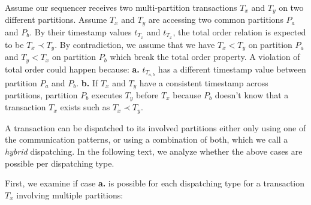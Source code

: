 \documentclass[a4paper, 10pt]{article}
\newcommand{\Li}[1]{\mynote{Li}{#1}{blue}}
\begin{document}
Assume our sequencer receives two multi-partition transactions $T_x$ and $T_y$ on two different partitions.
Assume $T_x$ and $T_y$ are accessing two common partitions $P_a$ and $P_b$. By their timestamp
values $t_{T_{x}}$ and $t_{T_x}$, the total order relation is expected to be $T_x \prec T_y$.
By contradiction, we assume that we have $T_x < T_y$ on partition $P_a$ and $T_y < T_x$ on partition
$P_b$ which break the total order property. A violation of total order could happen because:
\textbf{a.} $t_{T_{a,b}}$ has a different timestamp value between partition $P_a$ and $P_b$. \textbf{b.}
If $T_x$ and $T_y$ have a consistent timestamp across partitions, partition $P_b$ executes $T_y$
before $T_x$ because $P_b$ doesn't know that a transaction $T_x$ exists such as $T_x \prec T_y$.


A transaction can be dispatched to its involved partitions either only using
one of the communication patterns, or using a combination of both, which we
call a \textit{hybrid} dispatching. In the following text, we analyze whether
the above cases are possible per dispatching type.

First, we examine if case \textbf{a.} is possible for each dispatching type for a transaction $T_x$
involving multiple partitions:
\end{document}
